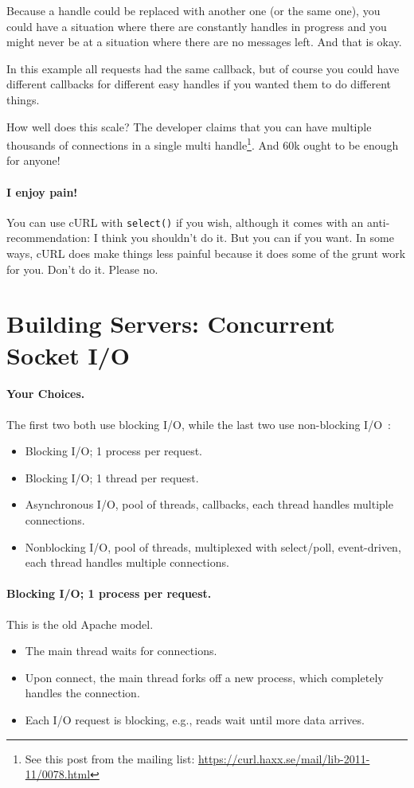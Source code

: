 Because a handle could be replaced with another one (or the same one), you could have a situation where there are constantly handles in progress and you might never be at a situation where there are no messages left. And that is okay.

In this example all requests had the same callback, but of course you could have different callbacks for different easy handles if you wanted them to do different things.

How well does this scale? The developer claims that you can have multiple thousands of connections in a single multi handle\footnote{See this post from the mailing list: \url{https://curl.haxx.se/mail/lib-2011-11/0078.html}}. And 60k ought to be enough for anyone!

\paragraph{I enjoy pain!} You can use cURL with \texttt{select()} if you wish, although it comes with an anti-recommendation: I think you shouldn't do it. But you can if you want. In some ways, cURL does make things less painful because it does some of the grunt work for you. Don't do it. Please no.

\section*{Building Servers: Concurrent Socket I/O}

\paragraph{Your Choices.} The first two both use blocking I/O, while the last two use
non-blocking I/O~\cite{gplus:concurrent}:\\[-3em]
    \begin{itemize}[noitemsep]
      \item Blocking I/O; 1 process per request.
      \item Blocking I/O; 1 thread per request.
      \item Asynchronous I/O, pool of threads, callbacks, each thread handles multiple connections.
      \item Nonblocking I/O, pool of threads, multiplexed with select/poll,
        event-driven, each thread handles multiple connections.
    \end{itemize}

\paragraph{Blocking I/O; 1 process per request.}
This is the old Apache model.\\[-3em]
  \begin{itemize}[noitemsep]
    \item The main thread waits for connections.
    \item Upon connect, the main thread forks off a new process, which completely
      handles the connection.
    \item Each I/O request is blocking, e.g., reads wait until more data arrives.
  \end{itemize}

